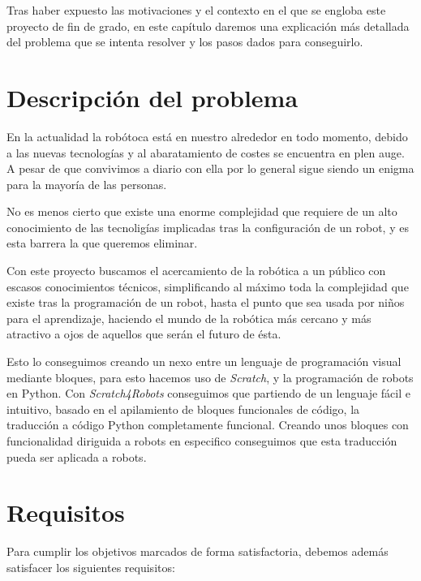 Tras haber expuesto las motivaciones y el contexto en el que se engloba este proyecto de fin de grado, en este capítulo daremos una explicación más detallada del problema que se
intenta resolver y los pasos dados para conseguirlo.


\section{Descripción del problema}
\label{sec:descripcion del problema}

En la actualidad la robótoca está en nuestro alrededor en todo momento, debido a las nuevas tecnologías y al abaratamiento de costes se encuentra en plen auge. A pesar de que convivimos a diario con ella por lo general sigue siendo un enigma para la mayoría de las personas.

No es menos cierto que existe una enorme complejidad que requiere de un alto conocimiento de las tecnoligías implicadas tras la configuración de un robot, y es esta barrera la que queremos eliminar.

Con este proyecto buscamos el acercamiento de la robótica a un público con escasos conocimientos técnicos, simplificando al máximo toda la complejidad que existe tras la programación de un robot, hasta el punto que sea usada por niños para el aprendizaje, haciendo el mundo de la robótica más cercano y más atractivo a ojos de aquellos que serán el futuro de ésta.

Esto lo conseguimos creando un nexo entre un lenguaje de programación visual mediante bloques, para esto hacemos uso de \textit{Scratch}, y la programación de robots en Python. Con \textit{Scratch4Robots} conseguimos que partiendo de un lenguaje fácil e intuitivo, basado en el apilamiento de bloques funcionales de código, la traducción a código Python completamente funcional. Creando unos bloques con funcionalidad diriguida a robots en especifico conseguimos que esta traducción pueda ser aplicada a robots.    

\section{Requisitos}
\label{sec:requisitos}

Para cumplir los objetivos marcados de forma satisfactoria, debemos además satisfacer
los siguientes requisitos:


